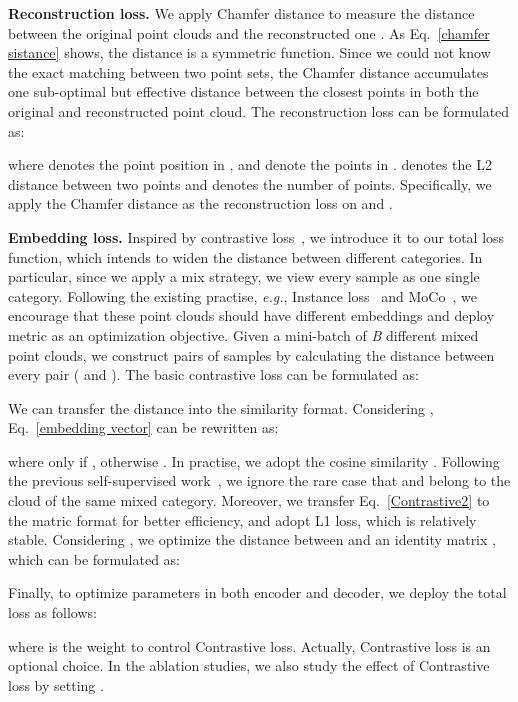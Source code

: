 \documentclass[journal]{IEEEtran}
\def\eg{\emph{e.g.}}
\begin{document}
\textbf{Reconstruction loss.}  
We apply Chamfer distance to measure the distance between the original point clouds  and the reconstructed one . As Eq.~\ref{chamfer sistance} shows, the distance is a symmetric function. Since we could not know the exact matching between two point sets, the Chamfer distance accumulates one sub-optimal but effective distance between the closest points in both the original and reconstructed point cloud. The reconstruction loss can be formulated as:
    {\setlength\abovedisplayskip{0.15cm}
     \setlength\belowdisplayskip{0.15cm}
    
    }
where  denotes the point position in , and  denote the points in .  denotes the L2 distance between two points and  denotes the number of points. 
Specifically, we apply the Chamfer distance as the reconstruction loss on  and . 




\textbf{Embedding loss.} Inspired by contrastive loss~\cite{2006Dimensionality}, we introduce it to our total loss function, which intends to widen the distance between different categories.
In particular, since we apply a mix strategy, we view every sample as one single category. 
Following the existing practise, \eg, Instance loss~\cite{zheng2017dual} and MoCo~\cite{he2020momentum}, we encourage that these point clouds should have different embeddings and deploy metric as an optimization objective.
Given a mini-batch of \textit{B} different mixed point clouds, we construct  pairs of samples by calculating the distance  between every pair ( and ). The basic contrastive loss can be formulated as:
{
\small

}
We can transfer the distance into the similarity format. Considering , Eq.~\ref{embedding vector} can be rewritten as: 
{\small
    
    }
\noindent where  only if , otherwise . In practise, we adopt the cosine similarity . Following the previous self-supervised work~\cite{he2020momentum}, we ignore the rare case that  and  belong to the cloud of the same mixed category.
Moreover, we transfer Eq.~\ref{Contrastive2} to the matric format for better efficiency, and adopt L1 loss, which is relatively stable. Considering , we optimize the distance between  and an identity matrix , which can be formulated as: 
    {\setlength\abovedisplayskip{0.15cm}
     \setlength\belowdisplayskip{0.15cm}
    
    }
Finally, to optimize parameters in both encoder and decoder, we deploy the total loss as follows:
{\setlength\abovedisplayskip{0.15cm}
     \setlength\belowdisplayskip{0.15cm}
    
}
where  is the weight to control Contrastive loss. Actually, Contrastive loss is an optional choice. In the ablation studies, we also study the effect of Contrastive loss by setting . 
\end{document}

